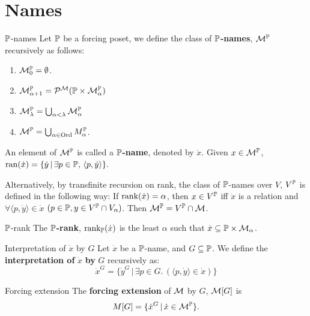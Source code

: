 \documentclass{article}
\begin{document}
\section{Names}
\begin{fancydefine}{$\mathbb{P}$-names}
    Let $\mathbb{P}$ be a forcing poset, we define the class of $\mathbb{P}$\textbf{-names}, $\mathcal{M}^{\mathbb{P}}$ recursively as follows: \begin{enumerate}
        \item[(i)] $\mathcal{M}_{0}^{\mathbb{P}}= \emptyset$.
        \item[(ii)] $\mathcal{M}_{\alpha + 1}^{\mathbb{P}} = \mathcal{P}^{\mathcal{M}}(\mathbb{P} \times \mathcal{M}_{\alpha}^{\mathbb{P}})$
        \item[(iii)] $\mathcal{M}_{\lambda}^{\mathbb{P}} = \bigcup_{\alpha < \lambda} \mathcal{M}_{\alpha}^{\mathbb{P}}$
        \item[(iv)] $\mathcal{M}^{\mathbb{P}} = \bigcup_{\alpha \in \operatorname{Ord}} M_{\alpha}^{\mathbb{P}}$.
    \end{enumerate}
    An element of $\mathcal{M}^{\mathbb{P}}$ is called a $\mathbb{P}$\textbf{-name}, denoted by $\dot{x}$. Given $x \in \mathcal{M}^{\mathbb{P}}$, $\operatorname{ran}(\dot{x}) = \{ \dot{y} \, | \, \exists p \in \mathbb{P}, \, \langle p, \dot{y}\rangle\}.$
\end{fancydefine}
\begin{remark*}
    Alternatively, by transfinite recursion on rank, the class of $\mathbb{P}$-names over $V$, $V^{\mathbb{P}}$ is defined in the following way: \gap
    If $\rank(\dot{x}) = \alpha$, then $x \in V^{\mathbb{P}}$ iff $\dot{x}$ is a relation and $\forall \langle p, \dot{y} \rangle \in \dot{x}$ $(p \in \mathbb{P}, y \in V^{\mathbb{P}} \cap V_{\alpha})$. Then $\mathcal{M}^{\mathbb{P}}= V^{\mathbb{P}} \cap \mathcal{M}$.
\end{remark*}
\begin{fancydefine}{$\mathbb{P}$-rank}
    The $\mathbb{P}$\textbf{-rank}, $\rank_{\mathbb{P}}(\dot{x})$ is the least $\alpha$ such that $\dot{x} \subseteq \mathbb{P} \times \mathcal{M}_{\alpha}$.
\end{fancydefine}
\begin{fancydefine}{Interpretation of $\dot{x}$ by $G$}
    Let $\dot{x}$ be a $\mathbb{P}$-name, and $G \subseteq \mathbb{P}$. We define the \textbf{interpretation of }$\dot{x}$\textbf{ by }$G$ recursively as: \[ \dot{x}^{G} = \{\dot{y}^{G} \, | \, \exists p \in G. \, (\langle p, \dot{y} \rangle \in \dot{x})\}\]
\end{fancydefine}
\begin{fancydefine}{Forcing extension}
    The \textbf{forcing extension} of $\mathcal{M}$ by $G$, $\mathcal{M}[G]$ is \[ M[G] = \{ \dot{x}^{G} \, | \, \dot{x} \in \mathcal{M}^{\mathbb{P}}\}.\]
\end{fancydefine}
\end{document}
